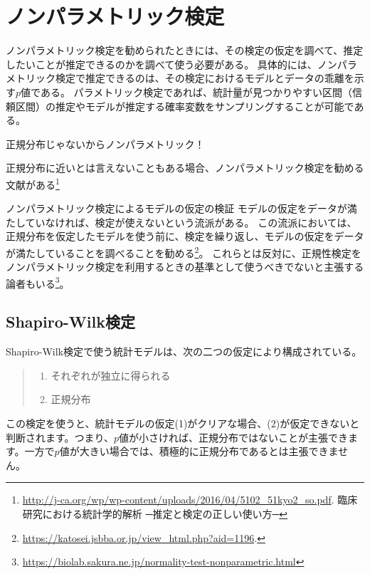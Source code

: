 
\chapter{ノンパラメトリック検定}

ノンパラメトリック検定を勧められたときには、その検定の仮定を調べて、推定したいことが推定できるのかを調べて使う必要がある。
具体的には、ノンパラメトリック検定で推定できるのは、その検定におけるモデルとデータの乖離を示す$p$値である。
パラメトリック検定であれば、統計量が見つかりやすい区間（信頼区間）の推定やモデルが推定する確率変数をサンプリングすることが可能である。

\begin{SMbox}{正規分布じゃないからノンパラメトリック！}
    
    正規分布に近いとは言えないこともある場合、ノンパラメトリック検定を勧める文献がある\footnote{\url{ http://j-ca.org/wp/wp-content/uploads/2016/04/5102_51kyo2_so.pdf}. 臨床研究における統計学的解析 ─推定と検定の正しい使い方─}
    
\end{SMbox}

\begin{SMbox}{ノンパラメトリック検定によるモデルの仮定の検証}
    モデルの仮定をデータが満たしていなければ、検定が使えないという流派がある。
    この流派においては、正規分布を仮定したモデルを使う前に、検定を繰り返し、モデルの仮定をデータが満たしていることを調べることを勧める\footnote{\url{https://katosei.jsbba.or.jp/view_html.php?aid=1196}.}。
    これらとは反対に、正規性検定をノンパラメトリック検定を利用するときの基準として使うべきでないと主張する論者もいる\footnote{\url{https://biolab.sakura.ne.jp/normality-test-nonparametric.html}}。
\end{SMbox}


\section{Shapiro-Wilk検定}
Shapiro-Wilk検定で使う統計モデルは、次の二つの仮定により構成されている。
\begin{quote}
    \begin{enumerate}[(1)]
\item それぞれが独立に得られる
\item 正規分布
\end{enumerate}
\end{quote}
この検定を使うと、統計モデルの仮定(1)がクリアな場合、(2)が仮定できないと判断されます。つまり、$p$値が小さければ、正規分布ではないことが主張できます。一方で$p$値が大きい場合では、積極的に正規分布であるとは主張できません。

